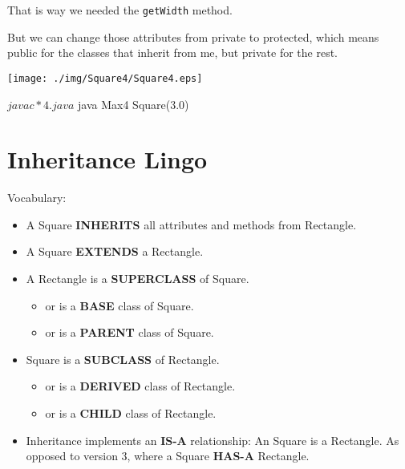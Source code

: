 \documentclass[a4paper, 9pt]{extarticle}
\begin{document}
That is way we needed the \verb+getWidth+ method.

But we can change those attributes from private to protected, which means
public for the classes that inherit from me, but private for the rest.

\begin{multicols}{2}
  \begin{center}
    \texttt{[image: ./img/Square4/Square4.eps]}
  \end{center}
\columnbreak
\end{multicols}

\begin{blackboard}
$ javac *4.java
$ java Max4
Square(3.0)
\end{blackboard}





\section{Inheritance Lingo}

Vocabulary:

\begin{itemize}

  \item A Square \textbf{INHERITS} all attributes and methods from Rectangle.

  \item A Square \textbf{EXTENDS} a Rectangle.

  \item A Rectangle is a \textbf{SUPERCLASS} of Square.

    \begin{itemize}

      \item or is a \textbf{BASE} class of Square.

      \item or is a \textbf{PARENT} class of Square.

    \end{itemize}

  \item Square is a \textbf{SUBCLASS} of Rectangle.

    \begin{itemize}

      \item or is a \textbf{DERIVED} class of Rectangle.

      \item or is a \textbf{CHILD} class of Rectangle.

    \end{itemize}

  \item Inheritance implements an \textbf{IS-A} relationship: An Square is a
    Rectangle.  As opposed to version 3, where a Square \textbf{HAS-A}
    Rectangle.

\end{itemize}
\end{document}
